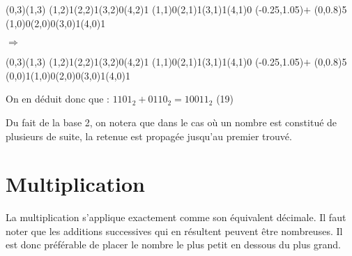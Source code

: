 \documentclass[11pt,a4paper]{article}
\begin{document}
\begin{center}
\begin{table}[ht!]
\begin{minipage}{0.15\textwidth}
\par\vspace{3\oplineheight}
\oplput(0,3){\tiny {}}\oplput(1,3){\tiny {}}
\oplput(1,2){1}\oplput(2,2){1}\oplput(3,2){0}\oplput(4,2){1}
\oplput(1,1){0}\oplput(2,1){1}\oplput(3,1){1}\oplput(4,1){0}
\oplput(-0.25,1.05){$+$}
\ophline(0,0.8){5}
\oplput(1,0){0}\oplput(2,0){0}\oplput(3,0){1}\oplput(4,0){1}

  \end{minipage}
  \hfillx
  \begin{minipage}{0.1\textwidth}

$ \Rightarrow $

  \end{minipage}
  \hfillx
  \begin{minipage}{0.15\textwidth}

\par\vspace{3\oplineheight}
\oplput(0,3){\tiny {}}\oplput(1,3){\tiny {}}
\oplput(1,2){1}\oplput(2,2){1}\oplput(3,2){0}\oplput(4,2){1}
\oplput(1,1){0}\oplput(2,1){1}\oplput(3,1){1}\oplput(4,1){0}
\oplput(-0.25,1.05){$+$}
\ophline(0,0.8){5}
\oplput(0,0){1}\oplput(1,0){0}\oplput(2,0){0}\oplput(3,0){1}\oplput(4,0){1}

  \end{minipage}
\end{table}

\end{center}

On en déduit donc que : $ 1101_{2} + 0110_{2} = 10011_{2} $ (19)

\smallskip

Du fait de la base 2, on notera que dans le cas où un nombre est constitué de plusieurs  \fg{} de suite, la retenue est propagée jusqu'au premier  \fg{} trouvé.

\bigskip

\vfillLast


\section{Multiplication}

\medskip

La multiplication s'applique exactement comme son équivalent décimale.
Il faut noter que les additions successives qui en résultent peuvent être nombreuses.
Il est donc préférable de placer le nombre le plus petit en dessous du plus grand.
\end{document}
